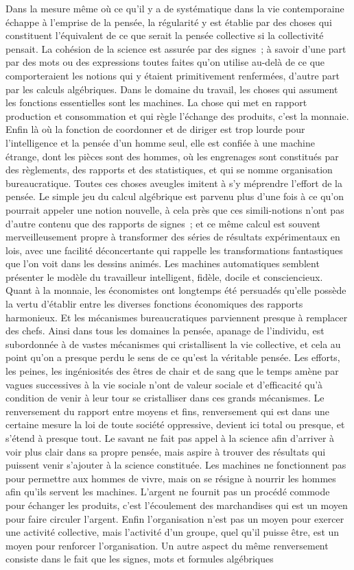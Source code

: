 \documentclass[french,twoside]{book} %
\begin{document}
Dans la mesure même où ce qu'il y a de systématique dans la vie contemporaine échappe à l'emprise de la pensée, la régularité y est établie par des choses qui constituent l'équivalent de ce que serait la pensée collective si la collectivité pensait. La cohésion de la science est assurée par des signes ; à savoir d'une part par des mots ou des expressions toutes faites qu'on utilise au-delà de ce que comporteraient les notions qui y étaient primitivement renfermées, d'autre part par les calculs algébriques. Dans le domaine du travail, les choses qui assument les fonctions essentielles sont les machines. La chose qui met en rapport production et consommation et qui règle l'échange des produits, c'est la monnaie. Enfin là où la fonction de coordonner et de diriger est trop lourde pour l'intelligence et la pensée d'un homme seul, elle est confiée à une machine étrange, dont les pièces sont des hommes, où les engrenages sont constitués par des règlements, des rapports et des statistiques, et qui se nomme organisation bureaucratique. Toutes ces choses aveugles imitent à s'y méprendre l'effort de la pensée. Le simple jeu du calcul algébrique est parvenu plus d'une fois à ce qu'on pourrait appeler une notion nouvelle, à cela près que ces simili-notions n'ont pas d'autre contenu que des rapports de signes ; et ce même calcul est souvent merveilleusement propre à transformer des séries de résultats expérimentaux en lois, avec une facilité déconcertante qui rappelle les transformations fantastiques que l'on voit dans les dessins animés. Les machines automatiques semblent présenter le modèle du travailleur intelligent, fidèle, docile et consciencieux. Quant à la monnaie, les économistes ont longtemps été persuadés qu'elle possède la vertu d'établir entre les diverses fonctions économiques des rapports harmonieux. Et les mécanismes bureaucratiques parviennent presque à remplacer des chefs. Ainsi dans tous les domaines la pensée, apanage de l'individu, est subordonnée à de vastes mécanismes qui cristallisent la vie collective, et cela au point qu'on a presque perdu le sens de ce qu'est la véritable pensée. Les efforts, les peines, les ingéniosités des êtres de chair et de sang que le temps amène par vagues successives à la vie sociale n'ont de valeur sociale et d'efficacité qu'à condition de venir à leur tour se cristalliser dans ces grands mécanismes. Le renversement du rapport entre moyens et fins, renversement qui est dans une certaine mesure la loi de toute société oppressive, devient ici total ou presque, et s'étend à presque tout. Le savant ne fait pas appel à la science afin d'arriver à voir plus clair dans sa propre pensée, mais aspire à trouver des résultats qui puissent venir s'ajouter à la science constituée. Les machines ne fonctionnent pas pour permettre aux hommes de vivre, mais on se résigne à nourrir les hommes afin qu'ils servent les machines. L'argent ne fournit pas un procédé commode pour échanger les produits, c'est l'écoulement des marchandises qui est un moyen pour faire circuler l'argent. Enfin l'organisation n'est pas un moyen pour exercer une activité collective, mais l'activité d'un groupe, quel qu'il puisse être, est un moyen pour renforcer l'organisation. Un autre aspect du même renversement consiste dans le fait que les signes, mots et formules algébriques 
\end{document}
